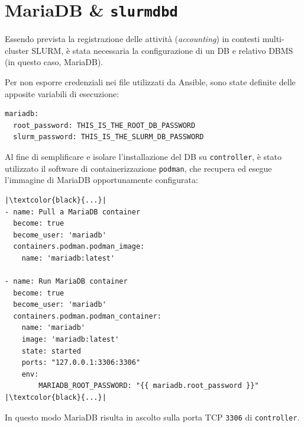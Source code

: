 \documentclass[12pt,a4paper,twoside,openright]{book}
\begin{document}
\section{MariaDB \& \texttt{slurmdbd}}
Essendo prevista la registrazione delle attività (\textit{accounting}) in contesti multi-cluster \ac{SLURM}, è stata necessaria la configurazione di un \ac{DB} e relativo \ac{DBMS} (in questo caso, MariaDB).

Per non esporre credenziali nei file utilizzati da Ansible, sono state definite delle apposite variabili di esecuzione:
\begin{verbatim}
mariadb:
  root_password: THIS_IS_THE_ROOT_DB_PASSWORD
  slurm_password: THIS_IS_THE_SLURM_DB_PASSWORD
\end{verbatim}
Al fine di semplificare e isolare l'installazione del \ac{DB} su \texttt{controller}, è stato utilizzato il software di containerizzazione \texttt{podman}, che recupera ed esegue l'immagine di MariaDB opportunamente configurata:
\begin{verbatim}
|\textcolor{black}{...}|
- name: Pull a MariaDB container
  become: true
  become_user: 'mariadb'
  containers.podman.podman_image:
    name: 'mariadb:latest'

- name: Run MariaDB container
  become: true
  become_user: 'mariadb'
  containers.podman.podman_container:
    name: 'mariadb'
    image: 'mariadb:latest'
    state: started
    ports: "127.0.0.1:3306:3306"
    env:
        MARIADB_ROOT_PASSWORD: "{{ mariadb.root_password }}"
|\textcolor{black}{...}|
\end{verbatim}
In questo modo MariaDB risulta in ascolto sulla porta \ac{TCP} \texttt{3306} di \texttt{controller}.
\end{document}
